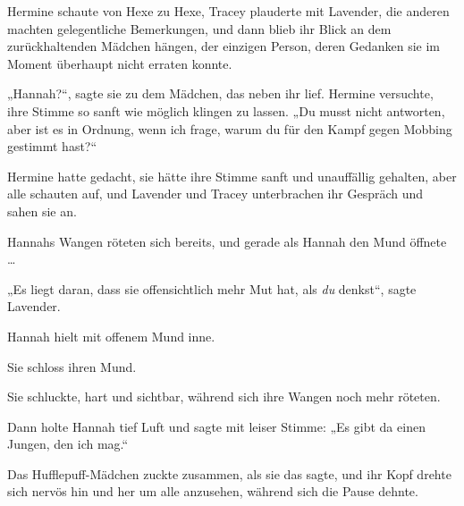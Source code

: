 Hermine schaute von Hexe zu Hexe, Tracey plauderte mit Lavender, die anderen machten gelegentliche Bemerkungen, und dann blieb ihr Blick an dem zurückhaltenden Mädchen hängen, der einzigen Person, deren Gedanken sie im Moment überhaupt nicht erraten konnte.

„Hannah?“, sagte sie zu dem Mädchen, das neben ihr lief. Hermine versuchte, ihre Stimme so sanft wie möglich klingen zu lassen.
„Du musst nicht antworten, aber ist es in Ordnung, wenn ich frage, warum du für den Kampf gegen Mobbing gestimmt hast?“

Hermine hatte gedacht, sie hätte ihre Stimme sanft und unauffällig gehalten, aber alle schauten auf, und Lavender und Tracey unterbrachen ihr Gespräch und sahen sie an.

Hannahs Wangen röteten sich bereits, und gerade als Hannah den Mund öffnete …

„Es liegt daran, dass sie offensichtlich mehr Mut hat, als \emph{du} denkst“, sagte Lavender.

Hannah hielt mit offenem Mund inne.

Sie schloss ihren Mund.

Sie schluckte, hart und sichtbar, während sich ihre Wangen noch mehr röteten.

Dann holte Hannah tief Luft und sagte mit leiser Stimme:
„Es gibt da einen Jungen, den ich mag.“

Das Hufflepuff-Mädchen zuckte zusammen, als sie das sagte, und ihr Kopf drehte sich nervös hin und her um alle anzusehen, während sich die Pause dehnte.

